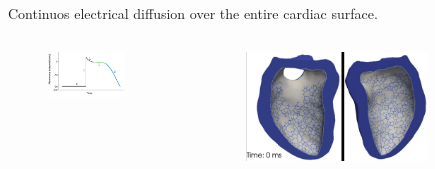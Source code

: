 \documentclass{beamer}
\begin{document}
\begin{frame}
\begin{center}
Continuos electrical diffusion over the entire cardiac surface.\\
\end{center}
\vspace{1cm}
\begin{columns}
            \begin{column}{0.5\textwidth}
                  \begin{figure}[t]
                  \includegraphics[width = 0.8\textwidth]{./potential_cycle.png}
                  \centering
                  \end{figure}
            \end{column}
            \begin{column}{0.5\textwidth}  
            \begin{figure}[t]
                  \includegraphics[width = 0.8\textwidth]{./image.png}
                  \centering
                  \end{figure} 
                  \centering
            \end{column}
     \end{columns}
\end{frame}
\end{document}
